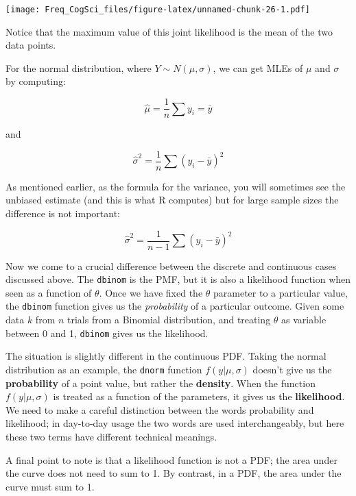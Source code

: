 \documentclass[12pt,]{krantz}
\begin{document}
\texttt{[image: Freq\_CogSci\_files/figure-latex/unnamed-chunk-26-1.pdf]}

Notice that the maximum value of this joint likelihood is the mean of the two data points.

For the normal distribution, where \(Y \sim N(\mu,\sigma)\), we can get MLEs of \(\mu\) and \(\sigma\) by computing:

\begin{equation}
  \hat \mu = \frac{1}{n}\sum y_i = \bar{y}  
\end{equation}

and

\begin{equation}
    \hat \sigma ^2 = \frac{1}{n}\sum (y_i-\bar{y})^2
\end{equation}

As mentioned earlier, as the formula for the variance, you will sometimes see the unbiased estimate (and this is what R computes) but for large sample sizes the difference is not important:

\begin{equation}
  \hat \sigma ^2 = \frac{1}{n-1}\sum (y_i-\bar{y})^2
\end{equation}

Now we come to a crucial difference between the discrete and continuous cases discussed above. The \texttt{dbinom} is the PMF, but it is also a likelihood function when seen as a function of \(\theta\). Once we have fixed the \(\theta\) parameter to a particular value, the \texttt{dbinom} function gives us the \emph{probability} of a particular outcome.
Given some data \(k\) from \(n\) trials from a Binomial distribution, and treating \(\theta\) as variable between 0 and 1, \texttt{dbinom} gives us the likelihood.

The situation is slightly different in the continuous PDF. Taking the normal distribution as an example, the \texttt{dnorm} function \(f(y|\mu,\sigma)\) doesn't give us the \textbf{probability} of a point value, but rather the \textbf{density}. When the function \(f(y|\mu,\sigma)\) is treated as a function of the parameters, it gives us the \textbf{likelihood}. We need to make a careful distinction between the words probability and likelihood; in day-to-day usage the two words are used interchangeably, but here these two terms have different technical meanings.

A final point to note is that a likelihood function is not a PDF; the area under the curve does not need to sum to 1. By contrast, in a PDF, the area under the curve must sum to 1.
\end{document}
